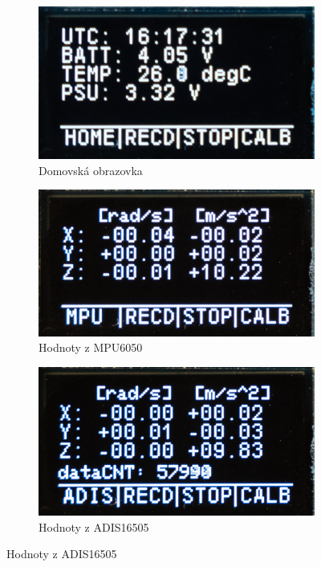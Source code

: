 \begin{figure}[h]
     \centering
     \begin{subfigure}[b]{0.29\textwidth}
         \centering
         \includegraphics[width=\textwidth]{obrazky/menuHome2}
         \caption{Domovská obrazovka}
       
     \end{subfigure}
     \hfill
     \centering
     \begin{subfigure}[b]{0.29\textwidth}
         \centering
         \includegraphics[width=\textwidth]{obrazky/menuMPU}
         \caption{Hodnoty z MPU6050}
         
     \end{subfigure}
     \hfill
     \centering
     \begin{subfigure}[b]{0.29\textwidth}
         \centering
         \includegraphics[width=\textwidth]{obrazky/menuADIS}
         \caption{Hodnoty z ADIS16505}
       

\end{subfigure}
\end{figure}

